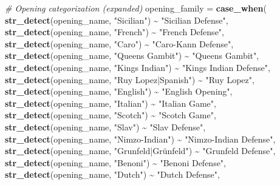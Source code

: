 \documentclass[
]{article}
\newenvironment{Shaded}{\begin{snugshade}}{\end{snugshade}}
\newcommand{\AttributeTok}[1]{\textcolor[rgb]{0.13,0.29,0.53}{#1}}
\newcommand{\CommentTok}[1]{\textcolor[rgb]{0.56,0.35,0.01}{\textit{#1}}}
\newcommand{\FunctionTok}[1]{\textcolor[rgb]{0.13,0.29,0.53}{\textbf{#1}}}
\newcommand{\NormalTok}[1]{#1}
\newcommand{\SpecialCharTok}[1]{\textcolor[rgb]{0.81,0.36,0.00}{\textbf{#1}}}
\newcommand{\StringTok}[1]{\textcolor[rgb]{0.31,0.60,0.02}{#1}}
\begin{document}
\begin{Shaded}
\begin{Highlighting}[]
      \CommentTok{\# Opening categorization (expanded)}
      \AttributeTok{opening\_family =} \FunctionTok{case\_when}\NormalTok{(}
        \FunctionTok{str\_detect}\NormalTok{(opening\_name, }\StringTok{"Sicilian"}\NormalTok{) }\SpecialCharTok{\textasciitilde{}} \StringTok{"Sicilian Defense"}\NormalTok{,}
        \FunctionTok{str\_detect}\NormalTok{(opening\_name, }\StringTok{"French"}\NormalTok{) }\SpecialCharTok{\textasciitilde{}} \StringTok{"French Defense"}\NormalTok{,}
        \FunctionTok{str\_detect}\NormalTok{(opening\_name, }\StringTok{"Caro"}\NormalTok{) }\SpecialCharTok{\textasciitilde{}} \StringTok{"Caro{-}Kann Defense"}\NormalTok{,}
        \FunctionTok{str\_detect}\NormalTok{(opening\_name, }\StringTok{"Queen\textquotesingle{}s Gambit"}\NormalTok{) }\SpecialCharTok{\textasciitilde{}} \StringTok{"Queen\textquotesingle{}s Gambit"}\NormalTok{,}
        \FunctionTok{str\_detect}\NormalTok{(opening\_name, }\StringTok{"King\textquotesingle{}s Indian"}\NormalTok{) }\SpecialCharTok{\textasciitilde{}} \StringTok{"King\textquotesingle{}s Indian Defense"}\NormalTok{,}
        \FunctionTok{str\_detect}\NormalTok{(opening\_name, }\StringTok{"Ruy Lopez|Spanish"}\NormalTok{) }\SpecialCharTok{\textasciitilde{}} \StringTok{"Ruy Lopez"}\NormalTok{,}
        \FunctionTok{str\_detect}\NormalTok{(opening\_name, }\StringTok{"English"}\NormalTok{) }\SpecialCharTok{\textasciitilde{}} \StringTok{"English Opening"}\NormalTok{,}
        \FunctionTok{str\_detect}\NormalTok{(opening\_name, }\StringTok{"Italian"}\NormalTok{) }\SpecialCharTok{\textasciitilde{}} \StringTok{"Italian Game"}\NormalTok{,}
        \FunctionTok{str\_detect}\NormalTok{(opening\_name, }\StringTok{"Scotch"}\NormalTok{) }\SpecialCharTok{\textasciitilde{}} \StringTok{"Scotch Game"}\NormalTok{,}
        \FunctionTok{str\_detect}\NormalTok{(opening\_name, }\StringTok{"Slav"}\NormalTok{) }\SpecialCharTok{\textasciitilde{}} \StringTok{"Slav Defense"}\NormalTok{,}
        \FunctionTok{str\_detect}\NormalTok{(opening\_name, }\StringTok{"Nimzo{-}Indian"}\NormalTok{) }\SpecialCharTok{\textasciitilde{}} \StringTok{"Nimzo{-}Indian Defense"}\NormalTok{,}
        \FunctionTok{str\_detect}\NormalTok{(opening\_name, }\StringTok{"Grunfeld|Grünfeld"}\NormalTok{) }\SpecialCharTok{\textasciitilde{}} \StringTok{"Grunfeld Defense"}\NormalTok{,}
        \FunctionTok{str\_detect}\NormalTok{(opening\_name, }\StringTok{"Benoni"}\NormalTok{) }\SpecialCharTok{\textasciitilde{}} \StringTok{"Benoni Defense"}\NormalTok{,}
        \FunctionTok{str\_detect}\NormalTok{(opening\_name, }\StringTok{"Dutch"}\NormalTok{) }\SpecialCharTok{\textasciitilde{}} \StringTok{"Dutch Defense"}\NormalTok{,}

\end{Highlighting}
\end{Shaded}
\end{document}
